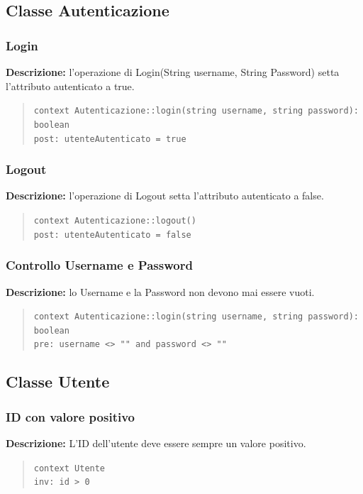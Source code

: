 \documentclass[12pt,a4paper]{article}
\begin{document}
\subsection{Classe Autenticazione} 

\subsubsection{Login} 
\textbf{Descrizione:} l'operazione di Login(String username, String Password) setta l'attributo autenticato a true.
\begin{quote}
\texttt{context Autenticazione::login(string username, string password): boolean}  \\
\texttt{post: utenteAutenticato = true} 
\end{quote}

\subsubsection{Logout} 
\textbf{Descrizione:} l'operazione di Logout setta l'attributo autenticato a false.
\begin{quote}
\texttt{context Autenticazione::logout()}  \\
\texttt{post: utenteAutenticato = false} 
\end{quote}

\subsubsection{Controllo Username e Password} 
\textbf{Descrizione:} lo Username e la Password non devono mai essere vuoti.
\begin{quote}
\texttt{context Autenticazione::login(string username, string password): boolean}  \\
\texttt{pre: username <> "" and password <> ""} 
\end{quote}

\subsection{Classe Utente}

\subsubsection{ID con valore positivo} 
\textbf{Descrizione:} L'ID dell'utente deve essere sempre un valore positivo.
\begin{quote}
\texttt{context Utente}  \\
\texttt{inv: id > 0} 
\end{quote}
\end{document}
